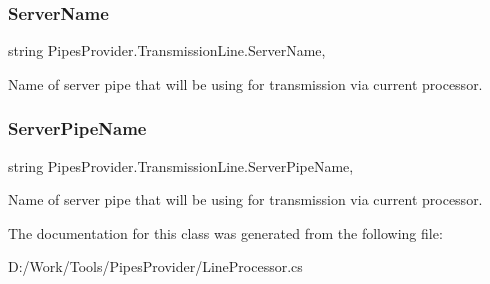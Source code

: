\subsubsection{\texorpdfstring{Server\+Name}{ServerName}}
{\footnotesize\ttfamily string Pipes\+Provider.\+Transmission\+Line.\+Server\+Name\hspace{0.3cm}{\ttfamily [get]}, {}}



Name of server pipe that will be using for transmission via current processor. 

\mbox{\label{class_pipes_provider_1_1_transmission_line_a6acb67e0969ca43a54c9895ab1cdaae8}} 
\subsubsection{\texorpdfstring{Server\+Pipe\+Name}{ServerPipeName}}
{\footnotesize\ttfamily string Pipes\+Provider.\+Transmission\+Line.\+Server\+Pipe\+Name\hspace{0.3cm}{\ttfamily [get]}, {}}



Name of server pipe that will be using for transmission via current processor. 



The documentation for this class was generated from the following file\+:\begin{DoxyCompactItemize}
\item 
D\+:/\+Work/\+Tools/\+Pipes\+Provider/Line\+Processor.\+cs\end{DoxyCompactItemize}
